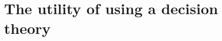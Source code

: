 \documentclass[a4paper]{article}
\newcommand\EU{\mathrm{EU}}
\newcommand\U{\mathfrak{U}} %
\newcommand{\todoold}[2][]{\todo[backgroundcolor=white,bordercolor=orange!10,linecolor=gray!10, #1,caption={},textcolor=gray]{Pre-rev: #2}}
\newcommand{\todooldinfo}[2][]{\todoold[#1]{#2}}
\renewcommand{\color}[1]{}
\newenvironment{colored}[1]{\leavevmode\color{#1}}{}
\newenvironment{CCM rewritten}
{\begingroup\color{blue}} %
{\endgroup}              %
\begin{document}






\section{The utility of using a decision theory}\label{sect:nu}




\end{document}
